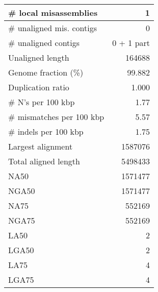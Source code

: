 \documentclass[12pt,a4paper]{article}
\begin{document}
\begin{table}[ht]
\begin{center}
\begin{tabular}{|l*{1}{|r}|}
\# local misassemblies & 1 \\ \hline
\# unaligned mis. contigs & 0 \\ \hline
\# unaligned contigs & 0 + 1 part \\ \hline
Unaligned length & 164688 \\ \hline
Genome fraction (\%) & 99.882 \\ \hline
Duplication ratio & 1.000 \\ \hline
\# N's per 100 kbp & 1.77 \\ \hline
\# mismatches per 100 kbp & 5.57 \\ \hline
\# indels per 100 kbp & 1.75 \\ \hline
Largest alignment & 1587076 \\ \hline
Total aligned length & 5498433 \\ \hline
NA50 & 1571477 \\ \hline
NGA50 & 1571477 \\ \hline
NA75 & 552169 \\ \hline
NGA75 & 552169 \\ \hline
LA50 & 2 \\ \hline
LGA50 & 2 \\ \hline
LA75 & 4 \\ \hline
LGA75 & 4 \\ \hline
\end{tabular}
\end{center}
\end{table}
\end{document}
